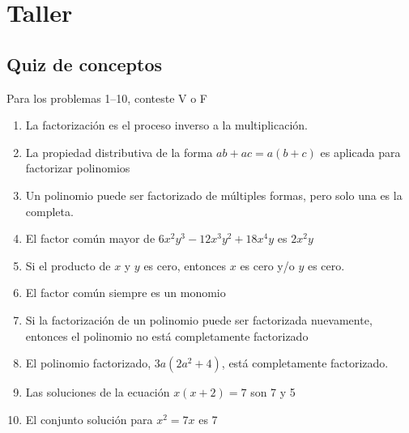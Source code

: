 \documentclass[10pt,twoside]{article}
\begin{document}
\section*{Taller}
\subsection*{Quiz de conceptos}
Para los problemas 1--10, conteste V o F
\begin{enumerate}
\item La factorizaci\'{o}n es el proceso inverso a la multiplicaci\'{o}n.
\item La propiedad distributiva de la forma $ab+ac=a(b+c)$ es aplicada para factorizar polinomios
\item Un polinomio puede ser factorizado de m\'{u}ltiples formas, pero solo una es la completa.
\item El factor común mayor de $6x^{2}y^{3}-12x^{3}y^{2}+18x^{4}y$ es $2x^{2}y$
\item Si el producto de $x$ y $y$ es cero, entonces $x$ es cero y/o $y$ es cero.
\item El factor común siempre es un monomio
\item Si la factorización de un polinomio puede ser factorizada nuevamente, entonces el polinomio no está completamente factorizado
\item El polinomio factorizado, $3a(2a^{2}+4)$, está completamente factorizado.
\item Las soluciones de la ecuación $x(x+2)=7$ son 7 y 5
\item El conjunto solución para $x^{2}=7x$ es 7
\end{enumerate}
\end{document}
